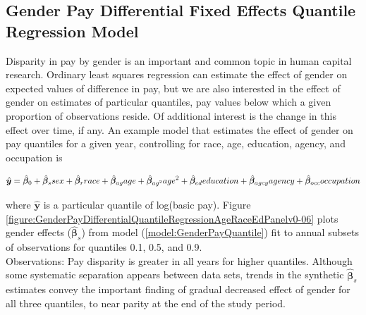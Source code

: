 \documentclass[10pt, letterpaper]{article}
\newcommand{\mest}[1]{\hat{\bm{#1}}}
\begin{document}
\begin{spacing}{1.0}
\clearpage

\section{Gender Pay Differential Fixed Effects Quantile Regression Model}

Disparity in pay by gender is an important and common topic in human capital research.  Ordinary least squares regression can estimate the effect of gender on expected values of difference in pay, but we are also interested in the effect of gender on estimates of particular quantiles, pay values below which a given proportion of observations reside.  Of additional interest is the change in this effect over time, if any.  An example model that estimates the effect of gender on pay quantiles for a given year, controlling for race, age, education, agency, and occupation is

\vspace{-10pt}
\begin{equation} \mest{y}=\mest{\beta}_0+\mest{\beta}_ssex+\mest{\beta}_rrace+\mest{\beta}_{ag}age+\mest{\beta}_{ag^2}age^2+\mest{\beta}_{ed}education+\mest{\beta}_{agcy}agency+\mest{\beta}_{occ}occupation\\
\label{model:GenderPayQuantile}
\end{equation}

where $\mest{y}$ is a particular quantile of log(basic pay).  Figure \ref{figure:GenderPayDifferentialQuantileRegressionAgeRaceEdPanelv0-06} plots gender effects ($\mest{\beta}_s$) from model (\ref{model:GenderPayQuantile}) fit to annual subsets of observations for quantiles 0.1, 0.5, and 0.9.\\

Observations:  Pay disparity is greater in all years for higher quantiles.  Although some systematic separation appears between data sets, trends in the synthetic $\mest{\beta}_s$ estimates convey the important finding of gradual decreased effect of gender for all three quantiles, to near parity at the end of the study period.

\vspace{20pt}


\end{spacing}
\end{document}
